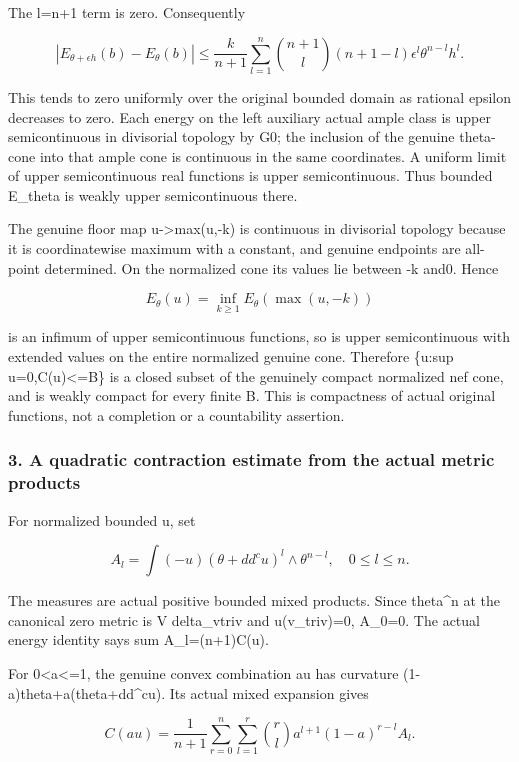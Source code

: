 \documentclass[
  10pt,
]{article}
\begin{document}
The l=n+1 term is zero. Consequently

\[|E_{\theta+\epsilon h}(b)-E_\theta(b)|
\le\frac{k}{n+1}\sum_{l=1}^n
\binom{n+1}l(n+1-l)\epsilon^l\theta^{n-l}h^l.\]

This tends to zero uniformly over the original bounded domain as
rational epsilon decreases to zero. Each energy on the left auxiliary
actual ample class is upper semicontinuous in divisorial topology by G0;
the inclusion of the genuine theta-cone into that ample cone is
continuous in the same coordinates. A uniform limit of upper
semicontinuous real functions is upper semicontinuous. Thus bounded
E\_theta is weakly upper semicontinuous there.

The genuine floor map u-\textgreater max(u,-k) is continuous in
divisorial topology because it is coordinatewise maximum with a
constant, and genuine endpoints are all-point determined. On the
normalized cone its values lie between -k and0. Hence

\[E_\theta(u)=\inf_{k\ge1}E_\theta(\max(u,-k))\]

is an infimum of upper semicontinuous functions, so is upper
semicontinuous with extended values on the entire normalized genuine
cone. Therefore \{u:sup u=0,C(u)\textless=B\} is a closed subset of the
genuinely compact normalized nef cone, and is weakly compact for every
finite B. This is compactness of actual original functions, not a
completion or a countability assertion.

\subsubsection{3. A quadratic contraction estimate from the actual
metric
products}\label{a-quadratic-contraction-estimate-from-the-actual-metric-products}

For normalized bounded u, set

\[A_l=\int(-u)(\theta+dd^cu)^l\wedge\theta^{n-l},\quad0\le l\le n.\]

The measures are actual positive bounded mixed products. Since
theta\^{}n at the canonical zero metric is V delta\_vtriv and
u(v\_triv)=0, A\_0=0. The actual energy identity says sum
A\_l=(n+1)C(u).

For 0\textless a\textless=1, the genuine convex combination au has
curvature (1-a)theta+a(theta+dd\^{}cu). Its actual mixed expansion gives

\[C(au)=\frac1{n+1}\sum_{r=0}^n\sum_{l=1}^r
\binom rl a^{l+1}(1-a)^{r-l}A_l.\]
\end{document}
